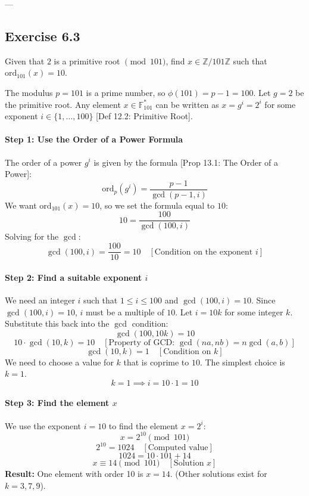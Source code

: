 ---

\subsection*{Exercise 6.3}
Given that $2$ is a primitive root $\pmod{101}$, find $x \in \mathbb{Z}/101\mathbb{Z}$ such that $\mathrm{ord}_{101}(x)=10$.

\begin{solution}
The modulus $p=101$ is a prime number, so $\phi(101) = p-1 = 100$.
Let $g=2$ be the primitive root. Any element $x \in \mathbb{F}_{101}^*$ can be written as $x = g^i = 2^i$ for some exponent $i \in \{1, \dots, 100\}$ [Def 12.2: Primitive Root].

\paragraph{Step 1: Use the Order of a Power Formula}
The order of a power $g^i$ is given by the formula [Prop 13.1: The Order of a Power]:
$$ \mathrm{ord}_{p}(g^i) = \frac{p-1}{\gcd(p-1, i)} $$
We want $\mathrm{ord}_{101}(x) = 10$, so we set the formula equal to $10$:
$$ 10 = \frac{100}{\gcd(100, i)} $$
Solving for the $\gcd$:
$$ \gcd(100, i) = \frac{100}{10} = 10 \quad [\text{Condition on the exponent } i] \text{}$$

\paragraph{Step 2: Find a suitable exponent $i$}
We need an integer $i$ such that $1 \le i \le 100$ and $\gcd(100, i) = 10$.
Since $\gcd(100, i) = 10$, $i$ must be a multiple of $10$. Let $i = 10k$ for some integer $k$.
Substitute this back into the $\gcd$ condition:
$$ \gcd(100, 10k) = 10 $$
$$ 10 \cdot \gcd(10, k) = 10 \quad [\text{Property of GCD: } \gcd(na, nb)=n\gcd(a, b)] $$
$$ \gcd(10, k) = 1 \quad [\text{Condition on } k] \text{}$$
We need to choose a value for $k$ that is coprime to $10$. The simplest choice is $k=1$.
$$ k=1 \implies i = 10 \cdot 1 = 10 $$

\paragraph{Step 3: Find the element $x$}
We use the exponent $i=10$ to find the element $x=2^i$:
$$ x = 2^{10} \pmod{101} $$
$$ 2^{10} = 1024 \quad [\text{Computed value}] $$
$$ 1024 = 10 \cdot 101 + 14 $$
$$ x \equiv 14 \pmod{101} \quad [\text{Solution } x] \text{} $$
\textbf{Result:} One element with order 10 is $x=14$. (Other solutions exist for $k=3, 7, 9$).
\end{solution}

